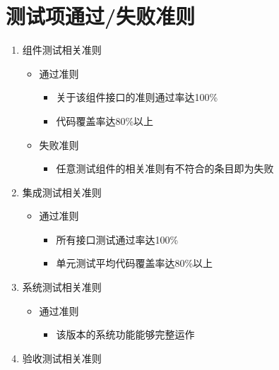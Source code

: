 \documentclass[hyperref, a4paper]{ctexart}
\providecommand{\tightlist}{%
  \setlength{\itemsep}{0pt}\setlength{\parskip}{0pt}}
\begin{document}
\hypertarget{ux6d4bux8bd5ux9879ux901aux8fc7ux5931ux8d25ux51c6ux5219}{%
\section{测试项通过/失败准则}\label{ux6d4bux8bd5ux9879ux901aux8fc7ux5931ux8d25ux51c6ux5219}}

\begin{enumerate}
\def\labelenumi{\arabic{enumi}.}
\tightlist
\item
  组件测试相关准则

  \begin{itemize}
  \tightlist
  \item
    通过准则

    \begin{itemize}
    \tightlist
    \item
      关于该组件接口的准则通过率达100\%
    \item
      代码覆盖率达80\%以上
    \end{itemize}
  \item
    失败准则

    \begin{itemize}
    \tightlist
    \item
      任意测试组件的相关准则有不符合的条目即为失败
    \end{itemize}
  \end{itemize}
\item
  集成测试相关准则

  \begin{itemize}
  \tightlist
  \item
    通过准则

    \begin{itemize}
    \tightlist
    \item
      所有接口测试通过率达100\%
    \item
      单元测试平均代码覆盖率达80\%以上
    \end{itemize}
  \end{itemize}
\item
  系统测试相关准则

  \begin{itemize}
  \tightlist
  \item
    通过准则

    \begin{itemize}
    \tightlist
    \item
      该版本的系统功能能够完整运作
    \end{itemize}
  \end{itemize}
\item
  验收测试相关准则


\end{enumerate}
\end{document}
